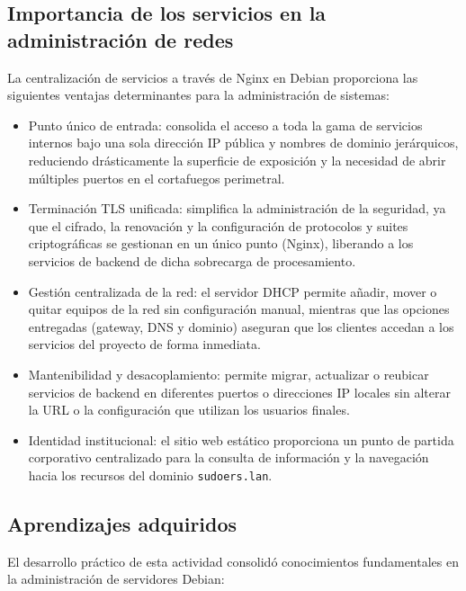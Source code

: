 \subsection{Importancia de los servicios en la administración de redes}

La centralización de servicios a través de Nginx en Debian proporciona las
siguientes ventajas determinantes para la administración de sistemas:

\begin{itemize}
  \item Punto único de entrada: consolida el acceso a toda la gama de servicios
        internos bajo una sola dirección IP pública y nombres de dominio
        jerárquicos, reduciendo drásticamente la superficie de exposición y la
        necesidad de abrir múltiples puertos en el cortafuegos perimetral.
  \item Terminación TLS unificada: simplifica la administración de la seguridad,
        ya que el cifrado, la renovación y la configuración de protocolos y
        suites criptográficas se gestionan en un único punto (Nginx), liberando
        a los servicios de backend de dicha sobrecarga de procesamiento.
  \item Gestión centralizada de la red: el servidor DHCP permite añadir,
        mover o quitar equipos de la red sin configuración manual, mientras
        que las opciones entregadas (gateway, DNS y dominio) aseguran que los
        clientes accedan a los servicios del proyecto de forma inmediata.
  \item Mantenibilidad y desacoplamiento: permite migrar, actualizar o
        reubicar servicios de backend en diferentes puertos o direcciones IP
        locales sin alterar la URL o la configuración que utilizan los usuarios
        finales.
  \item Identidad institucional: el sitio web estático proporciona un punto
        de partida corporativo centralizado para la consulta de información y la
        navegación hacia los recursos del dominio \texttt{sudoers.lan}.
\end{itemize}

\subsection{Aprendizajes adquiridos}

El desarrollo práctico de esta actividad consolidó conocimientos fundamentales
en la administración de servidores Debian:

